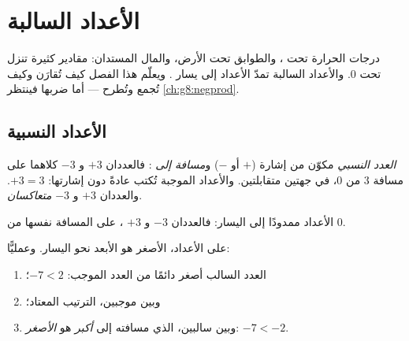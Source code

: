 \chapter{الأعداد السالبة}\label{ch:g7:negatives}

درجات الحرارة تحت ، والطوابق تحت الأرض، والمال المستدان: مقادير
كثيرة تنزل تحت $0$. والأعداد السالبة تمدّ  الأعداد إلى
يسار . ويعلّم هذا الفصل كيف تُقارَن وكيف تُجمع
وتُطرح --- أما ضربها فينتظر
\cref{ch:g8:negprod}.

\section{الأعداد النسبية}

\begin{definition}\label{def:g7:negatives:def}
\emph{العدد النسبي} مكوّن من إشارة
($+$ أو $-$) و\emph{مسافة إلى }: فالعددان $+3$ و $-3$ كلاهما على
مسافة $3$ من $0$، في جهتين متقابلتين. والأعداد الموجبة تُكتب عادةً
دون إشارتها: $+3 = 3$. والعددان $+3$ و $-3$
\emph{متعاكسان}.
\end{definition}

\begin{omfigure}

{\small {} الأعداد ممدودًا إلى اليسار: فالعددان $-3$ و $+3$
، على المسافة نفسها من $0$.}
\end{omfigure}

\begin{method}\label{met:g7:negatives:compare}
على  الأعداد، الأصغر هو الأبعد نحو اليسار. وعمليًّا:
\begin{enumerate}
  \item العدد السالب أصغر دائمًا من العدد الموجب:
        $-7 < 2$؛
  \item وبين موجبين، الترتيب المعتاد؛
  \item وبين سالبين، الذي مسافته إلى  \emph{أكبر} هو
        \emph{الأصغر}: $-7 < -2$.
\end{enumerate}
\end{method}


